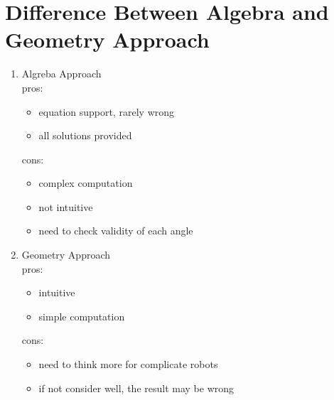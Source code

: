 \documentclass[12pt]{article}
\begin{document}
\section{Difference Between Algebra and Geometry Approach}
\begin{enumerate}
  \item Algreba Approach\\
    pros:
      \begin{itemize}
        \item equation support, rarely wrong
        \item all solutions provided
      \end{itemize}
    cons:
      \begin{itemize}
        \item complex computation
        \item not intuitive
        \item need to check validity of each angle
      \end{itemize}
  \item Geometry Approach\\
    pros:
      \begin{itemize}
        \item intuitive
        \item simple computation
      \end{itemize}
    cons:
      \begin{itemize}
        \item need to think more for complicate robots
        \item if not consider well, the result may be wrong
      \end{itemize}
\end{enumerate}
\end{document}
